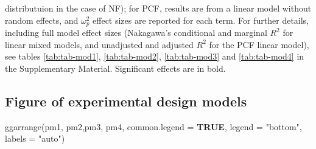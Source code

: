 \documentclass[
  bookmarksnumbered]{article}
\newenvironment{Shaded}{\begin{snugshade}}{\end{snugshade}}
\newcommand{\AttributeTok}[1]{\textcolor[rgb]{0.80,0.80,0.80}{#1}}
\newcommand{\ConstantTok}[1]{\textcolor[rgb]{0.86,0.64,0.64}{\textbf{#1}}}
\newcommand{\FunctionTok}[1]{\textcolor[rgb]{0.94,0.94,0.56}{#1}}
\newcommand{\NormalTok}[1]{\textcolor[rgb]{0.80,0.80,0.80}{#1}}
\newcommand{\StringTok}[1]{\textcolor[rgb]{0.80,0.58,0.58}{#1}}
\begin{document}
\begin{table}[H]
{\begin{threeparttable}
\begin{tablenotes}[para]
  distributuion in the case of NF); for PCF, results are from a linear model without 
  random effects, and $\omega^2_p$ effect sizes are reported for each term. For further 
  details, including full model effect sizes (Nakagawa's conditional and marginal $R^2$ for 
  linear mixed models, and unadjusted and adjusted $R^2$ for the PCF linear model), 
  see tables \ref{tab:tab-mod1}, \ref{tab:tab-mod2}, \ref{tab:tab-mod3} and 
  \ref{tab:tab-mod4} in the Supplementary Material. Significant effects are in bold.
\end{tablenotes}
\end{threeparttable}}
\end{table}

\subsection{Figure of experimental design models}\label{figure-of-experimental-design-models}

\begin{Shaded}
\begin{Highlighting}[]
\FunctionTok{ggarrange}\NormalTok{(pm1, pm2,pm3, pm4,}
          \AttributeTok{common.legend =} \ConstantTok{TRUE}\NormalTok{,}
          \AttributeTok{legend =} \StringTok{"bottom"}\NormalTok{,}
          \AttributeTok{labels =} \StringTok{"auto"}\NormalTok{)}
\end{Highlighting}
\end{Shaded}
\end{document}
